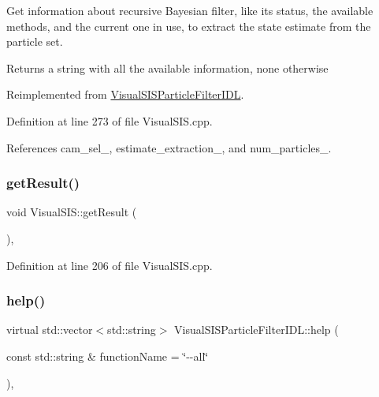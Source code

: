 Get information about recursive Bayesian filter, like it\textquotesingle{}s status, the available methods, and the current one in use, to extract the state estimate from the particle set. 

\begin{DoxyReturn}{Returns}
a string with all the available information, \textquotesingle{}none\textquotesingle{} otherwise 
\end{DoxyReturn}


Reimplemented from \hyperlink{classVisualSISParticleFilterIDL_a0721bc76b2d5848908a39e3a9c9740c0}{Visual\+S\+I\+S\+Particle\+Filter\+I\+DL}.



Definition at line 273 of file Visual\+S\+I\+S.\+cpp.



References cam\+\_\+sel\+\_\+, estimate\+\_\+extraction\+\_\+, and num\+\_\+particles\+\_\+.

\mbox{\label{classVisualSIS_a344387f214c60a62b2d79e7377f92693}} 
\subsubsection{\texorpdfstring{get\+Result()}{getResult()}}
{\footnotesize\ttfamily void Visual\+S\+I\+S\+::get\+Result (\begin{DoxyParamCaption}{ }\end{DoxyParamCaption})\hspace{0.3cm}{\ttfamily [override]}, {\ttfamily [protected]}}



Definition at line 206 of file Visual\+S\+I\+S.\+cpp.

\mbox{\label{classVisualSISParticleFilterIDL_a3253f4dbc55e47183c04eb2e1054733c}} 
\subsubsection{\texorpdfstring{help()}{help()}}
{\footnotesize\ttfamily virtual std\+::vector$<$std\+::string$>$ Visual\+S\+I\+S\+Particle\+Filter\+I\+D\+L\+::help (\begin{DoxyParamCaption}\item[{const std\+::string \&}]{function\+Name = {\ttfamily \char`\"{}-\/-\/all\char`\"{}} }\end{DoxyParamCaption})\hspace{0.3cm}{\ttfamily [virtual]}, {\ttfamily [inherited]}}

